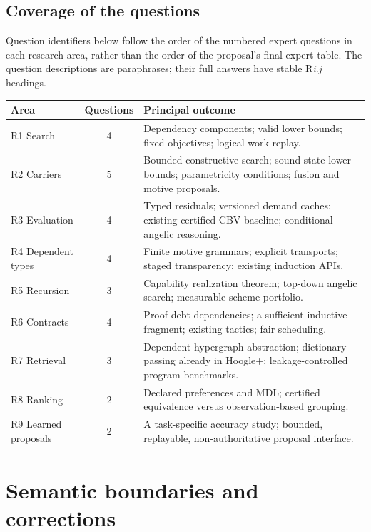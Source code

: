 \documentclass[11pt,a4paper]{article}
\theoremstyle{definition}
\theoremstyle{remark}
\begin{document}
\subsection{Coverage of the questions}
Question identifiers below follow the order of the numbered expert questions in
each research area, rather than the order of the proposal's final expert table.
The question descriptions are paraphrases; their full answers have stable
R\emph{i}.\emph{j} headings.

\begin{center}\small
\begin{tabularx}{\textwidth}{@{}l c X@{}}
\toprule
Area & Questions & Principal outcome\\
\midrule
R1 Search & 4 & Dependency components; valid lower bounds; fixed objectives;
logical-work replay.\\
R2 Carriers & 5 & Bounded constructive search; sound state lower bounds;
parametricity conditions; fusion and motive proposals.\\
R3 Evaluation & 4 & Typed residuals; versioned demand caches; existing certified
CBV baseline; conditional angelic reasoning.\\
R4 Dependent types & 4 & Finite motive grammars; explicit transports; staged
transparency; existing induction APIs.\\
R5 Recursion & 3 & Capability realization theorem; top-down angelic search;
measurable scheme portfolio.\\
R6 Contracts & 4 & Proof-debt dependencies; a sufficient inductive fragment;
existing tactics; fair scheduling.\\
R7 Retrieval & 3 & Dependent hypergraph abstraction; dictionary passing already
in Hoogle+; leakage-controlled program benchmarks.\\
R8 Ranking & 2 & Declared preferences and MDL; certified equivalence versus
observation-based grouping.\\
R9 Learned proposals & 2 & A task-specific accuracy study; bounded, replayable,
non-authoritative proposal interface.\\
\bottomrule
\end{tabularx}
\end{center}

\section{Semantic boundaries and corrections}
\label{sec:foundations}
\end{document}
